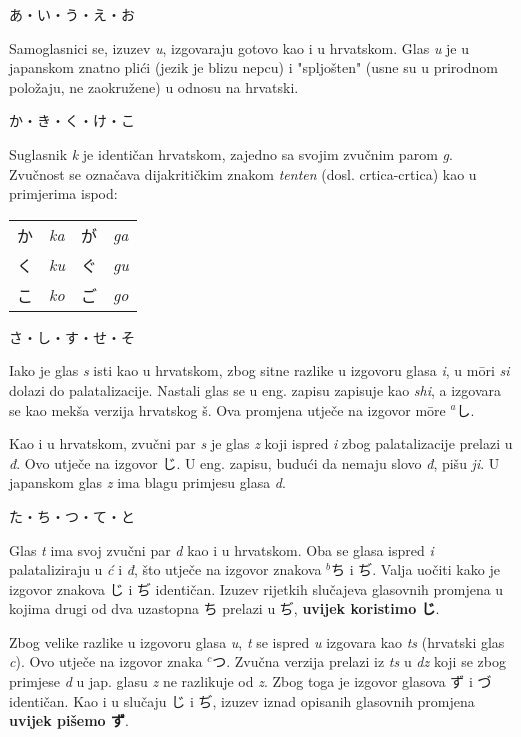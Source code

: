 	
	\noindent\ten あ・い・う・え・お
	
	Samoglasnici se, izuzev \textit{u}, izgovaraju gotovo kao i u hrvatskom. Glas \textit{u} je u japanskom znatno plići (jezik je blizu nepcu) i "spljošten" (usne su u prirodnom položaju, ne zaokružene) u odnosu na hrvatski.
	
	\vspace{5pt}
	\noindent\ten か・き・く・け・こ
	
	Suglasnik \textit{k} je identičan hrvatskom, zajedno sa svojim zvučnim parom \textit{g}. Zvučnost se označava dijakritičkim znakom \textit{tenten} (dosl. crtica-crtica) kao u primjerima ispod:
	
	\begin{tabular}{l l l l}
		か&\textit{ka}&が&\textit{ga}\\
		く&\textit{ku}&ぐ&\textit{gu}\\
		こ&\textit{ko}&ご&\textit{go}\\
	\end{tabular}

	\vspace{5pt}
	\noindent\ten さ・し・す・せ・そ
	
	Iako je glas \textit{s} isti kao u hrvatskom, zbog sitne razlike u izgovoru glasa \textit{i}, u m\={o}ri \textit{si} dolazi do palatalizacije. Nastali glas se u eng. zapisu zapisuje kao \textit{shi}, a izgovara se kao mekša verzija hrvatskog š. Ova promjena utječe na izgovor m\={o}re $^a$し.
	
	Kao i u hrvatskom, zvučni par \textit{s} je glas \textit{z} koji ispred \textit{i} zbog palatalizacije prelazi u \textit{đ}. Ovo utječe na izgovor じ. U eng. zapisu, budući da nemaju slovo \textit{đ}, pišu \textit{ji}. U japanskom glas \textit{z} ima blagu primjesu glasa \textit{d}.
	
	\vspace{5pt}
	\noindent\ten た・ち・つ・て・と
	
	Glas \textit{t} ima svoj zvučni par \textit{d} kao i u hrvatskom. Oba se glasa ispred \textit{i} palataliziraju u \textit{ć} i \textit{đ}, što utječe na izgovor znakova $^b$ち i ぢ. Valja uočiti kako je izgovor znakova じ i ぢ identičan. Izuzev rijetkih slučajeva glasovnih promjena u kojima drugi od dva uzastopna ち prelazi u ぢ, \textbf{uvijek koristimo じ}.
	
	Zbog velike razlike u izgovoru glasa \textit{u}, \textit{t} se ispred \textit{u} izgovara kao \textit{ts} (hrvatski glas \textit{c}). Ovo utječe na izgovor znaka $^c$つ. Zvučna verzija prelazi iz \textit{ts} u \textit{dz} koji se zbog primjese \textit{d} u jap. glasu \textit{z} ne razlikuje od \textit{z}. Zbog toga je izgovor glasova ず i づ identičan. Kao i u slučaju じ i ぢ, izuzev iznad opisanih glasovnih promjena \textbf{uvijek pišemo ず}.
	

